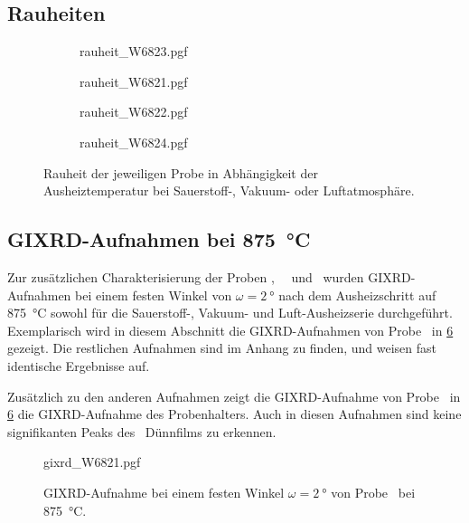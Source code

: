 \subsection{Rauheiten}\label{subsec:Rauheit}
\begin{figure}
    \begin{subfigure}{0.48\textwidth}
        \centering
        {rauheit_W6823.pgf}
        \caption{\samplethree}
        \label{fig: AFM, Sauerstoff}
    \end{subfigure}
    \begin{subfigure}{0.48\textwidth}
        \centering
        {rauheit_W6821.pgf}
        \caption{\sampleone}
        \label{fig: AFM, Sauerstoff}
    \end{subfigure}
    \begin{subfigure}{0.48\textwidth}
        \centering
        {rauheit_W6822.pgf}
        \caption{\sampletwo}
        \label{fig: AFM, Sauerstoff}
    \end{subfigure}
    \begin{subfigure}{0.48\textwidth}
        \centering
        {rauheit_W6824.pgf}
        \caption{\samplefour}
        \label{fig: AFM, Sauerstoff}
    \end{subfigure}
    \caption{Rauheit der jeweiligen Probe in Abhängigkeit der Ausheiztemperatur bei Sauerstoff-, Vakuum- oder
    Luftatmosphäre.}
\end{figure}
\newpage

\subsection{GIXRD-Aufnahmen bei \qty{875}{\degreeCelsius}}\label{subsec:GIXRD}
Zur zusätzlichen Charakterisierung der Proben \samplethree, \sampleone\, \sampletwo\ und \samplefour\ wurden
GIXRD-Aufnahmen bei einem festen Winkel von $\omega=\qty{2}{\degree}$ nach dem Ausheizschritt auf
\qty{875}{\degreeCelsius} sowohl für die Sauerstoff-, Vakuum- und Luft-Ausheizserie durchgeführt.
Exemplarisch wird in diesem Abschnitt die GIXRD-Aufnahmen von Probe \sampleone\ in \cref{fig:GIXRD_W6821} gezeigt.
Die restlichen Aufnahmen sind im Anhang zu finden, und weisen fast identische Ergebnisse auf.

Zusätzlich zu den anderen Aufnahmen zeigt die GIXRD-Aufnahme von Probe \sampleone\ in \cref{fig:GIXRD_W6821} die
GIXRD-Aufnahme des Probenhalters.
Auch in diesen Aufnahmen sind keine signifikanten Peaks des \heo\ Dünnfilms zu erkennen.

\begin{figure}
    \centering
    {gixrd_W6821.pgf}
    \caption{GIXRD-Aufnahme bei einem festen Winkel $\omega=\qty{2}{\degree}$ von Probe \sampleone\ bei
    \qty{875}{\degreeCelsius}.}
    \label{fig:GIXRD_W6821}
\end{figure}


